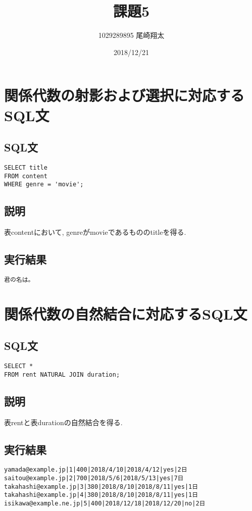 \documentclass{jarticle}
\begin{document}
\title{課題5}
\author{1029289895 尾崎翔太}
\date{2018/12/21}

\maketitle
\newpage

\section{関係代数の射影および選択に対応するSQL文}
\subsection{SQL文}
\begin{verbatim}
SELECT title 
FROM content 
WHERE genre = 'movie';
\end{verbatim}
\subsection{説明}
表contentにおいて, genreがmovieであるもののtitleを得る.
\subsection{実行結果}
\begin{verbatim}
君の名は。
\end{verbatim}
\section{関係代数の自然結合に対応するSQL文}
\subsection{SQL文}
\begin{verbatim}
SELECT * 
FROM rent NATURAL JOIN duration;
\end{verbatim}
\subsection{説明}
表rentと表durationの自然結合を得る.
\subsection{実行結果}
\begin{verbatim}
yamada@example.jp|1|400|2018/4/10|2018/4/12|yes|2日
saitou@example.jp|2|700|2018/5/6|2018/5/13|yes|7日
takahashi@example.jp|3|380|2018/8/10|2018/8/11|yes|1日
takahashi@example.jp|4|380|2018/8/10|2018/8/11|yes|1日
isikawa@example.ne.jp|5|400|2018/12/18|2018/12/20|no|2日
\end{verbatim}
\end{document}
